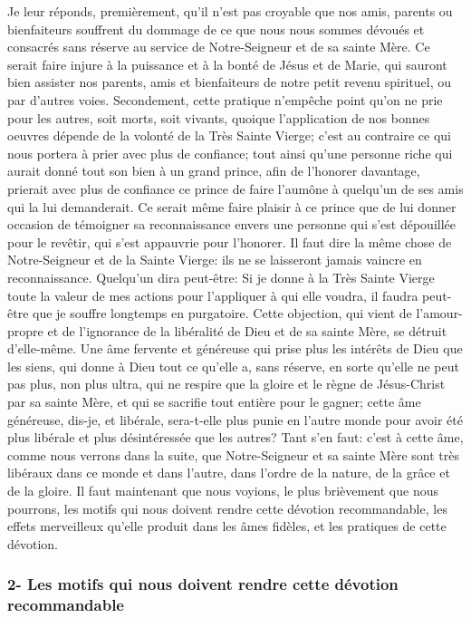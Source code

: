 Je leur réponds, premièrement, qu'il n'est pas croyable que nos amis, parents ou bienfaiteurs souffrent du
dommage de ce que nous nous sommes dévoués et consacrés sans réserve au service de Notre-Seigneur et de
sa sainte Mère. Ce serait faire injure à la puissance et à la bonté de Jésus et de Marie, qui sauront bien assister
nos parents, amis et bienfaiteurs de notre petit revenu spirituel, ou par d'autres voies.
Secondement, cette pratique n'empêche point qu'on ne prie pour les autres, soit morts, soit vivants, quoique
l'application de nos bonnes oeuvres dépende de la volonté de la Très Sainte Vierge; c'est au contraire ce qui nous
portera à prier avec plus de confiance; tout ainsi qu'une personne riche qui aurait donné tout son bien à un grand
prince, afin de l'honorer davantage, prierait avec plus de confiance ce prince de faire l'aumône à quelqu'un de ses
amis qui la lui demanderait. Ce serait même faire plaisir à ce prince que de lui donner occasion de témoigner sa
reconnaissance envers une personne qui s'est dépouillée pour le revêtir, qui s'est appauvrie pour l'honorer. Il faut
dire la même chose de Notre-Seigneur et de la Sainte Vierge: ils ne se laisseront jamais vaincre en
reconnaissance.
 Quelqu'un dira peut-être: Si je donne à la Très Sainte Vierge toute la valeur de mes actions pour l'appliquer à
qui elle voudra, il faudra peut-être que je souffre longtemps en purgatoire.
Cette objection, qui vient de l'amour-propre et de l'ignorance de la libéralité de Dieu et de sa sainte Mère, se détruit
d'elle-même. Une âme fervente et généreuse qui prise plus les intérêts de Dieu que les siens, qui donne à Dieu
tout ce qu'elle a, sans réserve, en sorte qu'elle ne peut pas plus, non plus ultra, qui ne respire que la gloire et le
règne de Jésus-Christ par sa sainte Mère, et qui se sacrifie tout entière pour le gagner; cette âme généreuse, dis-je, et libérale, sera-t-elle plus punie en l'autre monde pour avoir été plus libérale et plus désintéressée que les
autres? Tant s'en faut: c'est à cette âme, comme nous verrons dans la suite, que Notre-Seigneur et sa sainte Mère
sont très libéraux dans ce monde et dans l'autre, dans l'ordre de la nature, de la grâce et de la gloire.
 Il faut maintenant que nous voyions, le plus brièvement que nous pourrons, les motifs qui nous doivent
rendre cette dévotion recommandable, les effets merveilleux qu'elle produit dans les âmes fidèles, et les pratiques
de cette dévotion.

\subsubsection{2- Les motifs qui nous doivent rendre cette dévotion recommandable}
